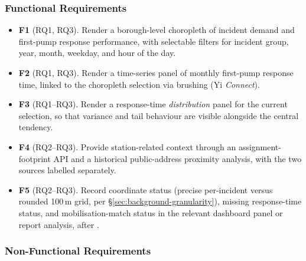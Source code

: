 \subsubsection{Functional Requirements}
\begin{itemize}
    \item \textbf{F1} (RQ1, RQ3). Render a borough-level choropleth of incident demand and first-pump response performance, with selectable filters for incident group, year, month, weekday, and hour of the day.
    \item \textbf{F2} (RQ1, RQ3). Render a time-series panel of monthly first-pump response time, linked to the choropleth selection via brushing (Yi \emph{Connect}).
    \item \textbf{F3} (RQ1--RQ3). Render a response-time \emph{distribution} panel for the current selection, so that variance and tail behaviour are visible alongside the central tendency.
    \item \textbf{F4} (RQ2--RQ3). Provide station-related context through an assignment-footprint API and a historical public-address proximity analysis, with the two sources labelled separately.
    \item \textbf{F5} (RQ2--RQ3). Record coordinate status (precise per-incident versus rounded 100\,m grid, per \S\ref{sec:background-granularity}), missing response-time status, and mobilisation-match status in the relevant dashboard panel or report analysis, after \cite{maceachren2012}.
\end{itemize}

\subsubsection{Non-Functional Requirements}

